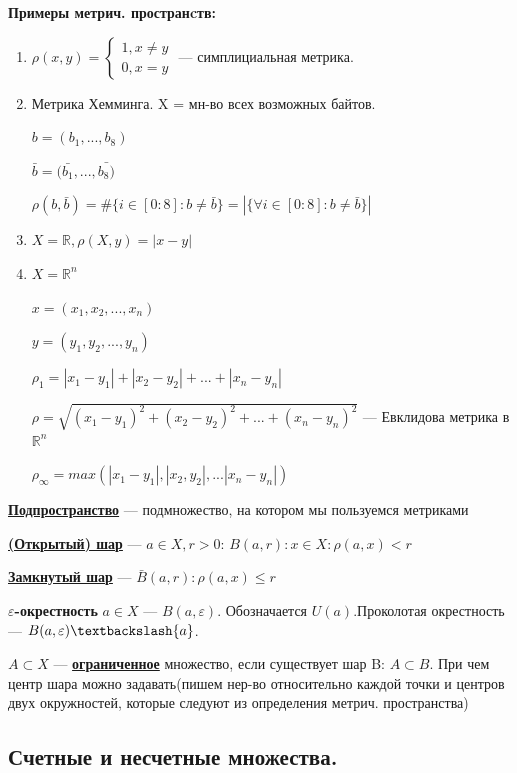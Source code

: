 \documentclass{article}
\newcommand{\deff}[1]{\underline{\textbf{#1}}}
\begin{document}
\textbf{Примеры метрич. пространcтв:}
\begin{enumerate}
    \item  $
\rho(x,y) = 
 \begin{cases}
  1, x \neq y \\
  0, x = y
 \end{cases}
$ --- симплициальная метрика.

    \item  Метрика Хемминга. X = мн-во всех возможных байтов.

$b = (b_1,...,b_8)$

$\bar{b} = (\bar{b_1},...,\bar{b_8)}$

$\rho(b,\bar{b}) = \#\{ i \in [0:8]: b \neq \bar{b}\} = |\{\forall i \in [0:8]: b \neq \bar{b}\}|$ 

\item $X = \mathds{R} , \rho(X,y) = |x-y|$
\item $X= \mathds{R}^n$

$x=(x_1,x_2,...,x_n)$

$y=(y_1,y_2,...,y_n)$

$\rho_1 = |x_1-y_1| +|x_2-y_2| +... +|x_n-y_n|$

$\rho = \sqrt{(x_1-y_1)^2 + (x_2-y_2)^2 +... + (x_n-y_n)^2}$ --- Евклидова метрика в $\mathds{R}^n$

$\rho_{\infty} = max(|x_1-y_1|,|x_2,y_2|,...|x_n-y_n|)$

\end{enumerate}

\deff{Подпространство} --- подмножество, на котором мы пользуемся метриками 

\deff{(Открытый) шар} --- $a \in X, r>0$: $B(a,r) : {x \in X: \rho(a,x)<r}$

\deff{Замкнутый шар} --- $\bar{B}(a,r):\rho(a,x)\leq r$

\textbf{$\varepsilon$-окрестность} $a \in X$ --- $B(a,\varepsilon)$.  Обозначается $U(a)$.Проколотая окрестность ---  $B(a,\varepsilon) \textbackslash \{a\}$.

$A \subset X$ --- \deff{ограниченное} множество, если существует шар B: $A \subset B$. При чем центр шара можно задавать(пишем нер-во относительно каждой точки и центров двух окружностей, которые следуют из определения метрич. пространства)

\pagebreak

\subsection{Счетные и несчетные множества.}
\end{document}
